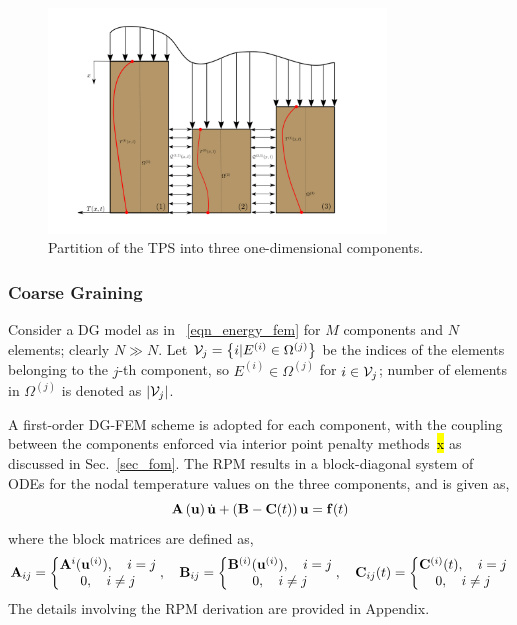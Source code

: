 \begin{figure}
    \centering
    \includegraphics[width=0.8\textwidth]{./figs/three_components.png}
    \caption{Partition of the TPS into three one-dimensional components.}
    \label{fig_domain_partition}
\end{figure}

\subsubsection{Coarse Graining}

Consider a DG model as in ~\cref{eqn_energy_fem} for $M$ components and $N$ elements; clearly $N\gg N$. Let $\mathcal{V}_j=\left\{i | E^{(i)}\in\Omega^{(j)}\right\}$ be the indices of the elements belonging to the $j$-th component, so $E^{(i)}\in\Omega^{(j)}$ for $i\in\mathcal{V}_j$; number of elements in $\Omega^{(j)}$ is denoted as $\left|\mathcal{V}_j\right|$.

A first-order DG-FEM scheme is adopted for each component, with the coupling between the components enforced via interior point penalty methods~\hl{x} as discussed in Sec.~\ref{sec_fom}. The RPM results in a block-diagonal system of ODEs for the nodal temperature values on the three components, and is given as,
\begin{equation}
    \mathbf{A}\left(\mathbf{u}\right)\dot{\mathbf{u}} + \left(\mathbf{B} - \mathbf{C}(t)\right)\mathbf{u} = \mathbf{f}(t)\label{eqn_rpm}
\end{equation}
where the block matrices are defined as,
\begin{equation}
    \mathbf{A}_{ij} = \left\{\begin{matrix}
        \mathbf{A}^{i}(\mathbf{u}^{(i)}),\quad i=j\\
        0,\quad i\neq j
    \end{matrix}\right.,\quad \mathbf{B}_{ij} = \left\{\begin{matrix}
        \mathbf{B}^{(i)}(\mathbf{u}^{(i)}),\quad i=j\\
        0,\quad i\neq j
    \end{matrix}\right.,\quad \mathbf{C}_{ij}(t) = \left\{\begin{matrix}
        \mathbf{C}^{(i)}(t),\quad i=j\\
        0,\quad i\neq j
    \end{matrix}\right.
\end{equation}
The details involving the RPM derivation are provided in Appendix.

